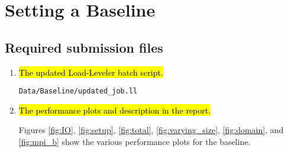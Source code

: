 \section{Setting a Baseline}
\subsection{Required submission files}
\begin{enumerate}
	\item \hl{The updated Load-Leveler batch script.}

		\verb!Data/Baseline/updated_job.ll!

	\item \hl{The performance plots and description in the report.}

		Figures \ref{fig:IO}, \ref{fig:setup}, \ref{fig:total}, \ref{fig:varying_size}, \ref{fig:domain}, and \ref{fig:mpi_b} show the various performance plots for the baseline.

\end{enumerate}

